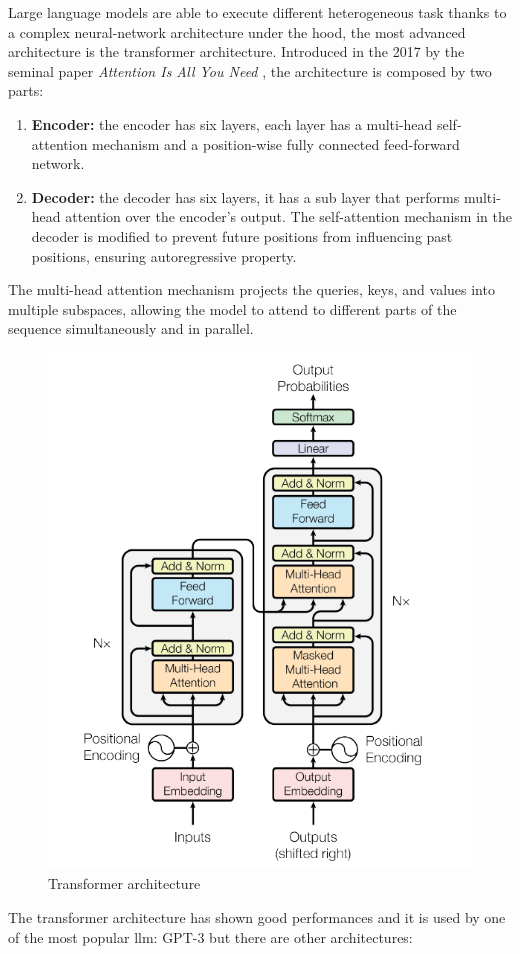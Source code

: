 Large language models are able to execute different heterogeneous task thanks to a complex neural-network architecture under the hood, the most advanced architecture is the transformer architecture.
Introduced in the 2017 by the seminal paper \textit{Attention Is All You Need} \cite{vaswani2017attention}, the architecture is composed by two parts:
\begin{enumerate}
    \item \textbf{Encoder:} the encoder has six layers, each layer has a multi-head self-attention mechanism and a position-wise fully connected feed-forward network.

    \item \textbf{Decoder:} the decoder has six layers, it has a sub layer that performs multi-head attention over the encoder’s output. The self-attention mechanism in the decoder is modified to prevent future positions from influencing past positions, ensuring autoregressive property.
\end{enumerate}
The multi-head attention mechanism projects the queries, keys, and values into multiple subspaces, allowing the model to attend to different parts of the sequence simultaneously and in parallel.
\begin{figure}[H]
    \centering
    \includegraphics[width=0.5\linewidth]{Figures/fig_17.png}
    \caption{Transformer architecture}
    \label{fig:enter-label}
\end{figure}
The transformer architecture has shown good performances and it is used by one of the most popular llm: GPT-3 \cite{gpt_dugas} but there are other architectures\cite{naveed2023comprehensive}:
